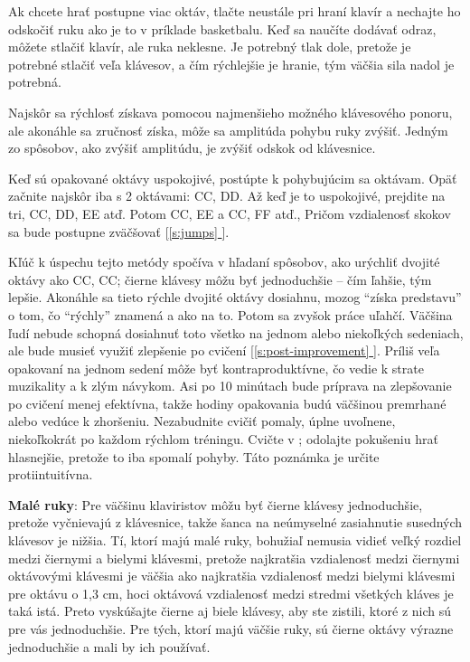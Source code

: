 \documentclass[11pt,a4paper]{book}
\newcommand{\musicfont}[1]{\raisebox{0.2em}{\fontspec[Scale=2.5,Path=fonts/]{Musica.ttf}{#1}}}
\newcommand*{\fullref}[1]{\hyperref[{#1}]{\ref*{#1} \nameref*{#1}}} %
\newcommand*{\fullrefp}[1]{[\fullref{#1}]} %
\begin{document}
Ak chcete hrať postupne viac oktáv, tlačte neustále pri hraní klavír a nechajte ho odskočiť ruku ako je to v príklade basketbalu. Keď sa naučíte dodávať odraz, môžete stlačiť klavír, ale ruka neklesne. Je potrebný tlak dole, pretože je potrebné stlačiť veľa klávesov, a čím rýchlejšie je hranie, tým väčšia sila nadol je potrebná.

Najskôr sa rýchlosť získava pomocou najmenšieho možného klávesového ponoru, ale akonáhle sa zručnosť získa, môže sa amplitúda pohybu ruky zvýšiť. Jedným zo spôsobov, ako zvýšiť amplitúdu, je zvýšiť odskok od klávesnice.

Keď sú opakované oktávy uspokojivé, postúpte k pohybujúcim sa oktávam. Opäť začnite najskôr iba s 2 oktávami: CC, DD. Až keď je to uspokojivé, prejdite na tri, CC, DD, EE atď. Potom CC, EE a CC, FF atď., Pričom vzdialenosť skokov sa bude postupne zväčšovať \fullrefp{s:jumps}.

Kľúč k úspechu tejto metódy spočíva v hľadaní spôsobov, ako urýchliť dvojité oktávy ako CC, CC; čierne klávesy môžu byť jednoduchšie – čím ľahšie, tým lepšie. Akonáhle sa tieto rýchle dvojité oktávy dosiahnu, mozog “získa predstavu” o tom, čo “rýchly” znamená a ako na to. Potom sa zvyšok práce uľahčí. Väčšina ľudí nebude schopná dosiahnuť toto všetko na jednom alebo niekoľkých sedeniach, ale bude musieť využiť zlepšenie po cvičení \fullrefp{s:post-improvement}. Príliš veľa opakovaní na jednom sedení môže byť kontraproduktívne, čo vedie k strate muzikality a k zlým návykom. Asi po 10 minútach bude príprava na zlepšovanie po cvičení menej efektívna, takže hodiny opakovania budú väčšinou premrhané alebo vedúce k zhoršeniu. Nezabudnite cvičiť pomaly, úplne uvoľnene, niekoľkokrát po každom rýchlom tréningu. Cvičte v \musicfont{𝆏}; odolajte pokušeniu hrať hlasnejšie, pretože to iba spomalí pohyby. Táto poznámka je určite protiintuitívna.

\textbf{Malé ruky}: Pre väčšinu klaviristov môžu byť čierne klávesy jednoduchšie, pretože vyčnievajú z klávesnice, takže šanca na neúmyselné zasiahnutie susedných klávesov je nižšia. Tí, ktorí majú malé ruky, bohužiaľ nemusia vidieť veľký rozdiel medzi čiernymi a bielymi klávesmi, pretože najkratšia vzdialenosť medzi čiernymi oktávovými klávesmi je väčšia ako najkratšia vzdialenosť medzi bielymi klávesmi pre oktávu o 1,3 cm, hoci oktávová vzdialenosť medzi stredmi všetkých kláves je taká istá. Preto vyskúšajte čierne aj biele klávesy, aby ste zistili, ktoré z nich sú pre vás jednoduchšie. Pre tých, ktorí majú väčšie ruky, sú čierne oktávy výrazne jednoduchšie a mali by ich používať. 
\end{document}
